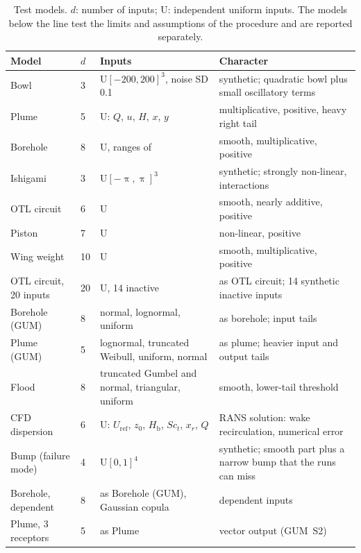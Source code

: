 \begin{table}[tb]
\centering
\caption{Test models. $d$: number of inputs; U: independent uniform inputs.
The models below the line test the limits and assumptions of the procedure
and are reported separately.}
\label{tab:models}
\small
\begin{tabular}{llp{53mm}p{54mm}}
\toprule
Model & $d$ & Inputs & Character\\
\midrule
Bowl & 3 & U$[-200,200]^3$, noise SD 0.1 & synthetic; quadratic bowl plus small oscillatory terms\\
Plume & 5 & U: $Q$, $u$, $H$, $x$, $y$ & multiplicative, positive, heavy right tail\\
Borehole & 8 & U, ranges of~\cite{vlse} & smooth, multiplicative, positive\\
Ishigami & 3 & U$[-\uppi,\uppi]^3$ & synthetic; strongly non-linear, interactions\\
OTL circuit & 6 & U~\cite{benari2007} & smooth, nearly additive, positive\\
Piston & 7 & U~\cite{benari2007} & non-linear, positive\\
Wing weight & 10 & U~\cite{forrester2008} & smooth, multiplicative, positive\\
OTL circuit, 20 inputs & 20 & U, 14 inactive~\cite{moon2010} & as OTL circuit; 14 synthetic inactive inputs\\
Borehole (GUM) & 8 & normal, lognormal, uniform~\cite{harper1983} & as borehole; input tails\\
Plume (GUM) & 5 & lognormal, truncated Weibull, uniform, normal & as plume; heavier input and output tails\\
Flood & 8 & truncated Gumbel and normal, triangular, uniform~\cite{iooss2015} & smooth, lower-tail threshold\\
CFD dispersion & 6 & U: $U_{\mathrm{ref}}$, $z_0$, $H_{\mathrm b}$, $Sc_t$, $x_r$, $Q$ & RANS solution: wake recirculation, numerical error\\
\midrule
Bump (failure mode) & 4 & U$[0,1]^4$ & synthetic; smooth part plus a narrow bump that the runs can miss\\
Borehole, dependent & 8 & as Borehole (GUM), Gaussian copula & dependent inputs\\
Plume, 3 receptors & 5 & as Plume & vector output (GUM~S2)\\
\bottomrule
\end{tabular}
\end{table}

